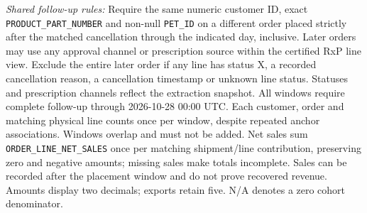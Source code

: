 \begin{table}[!htbp]
\begin{minipage}{\linewidth}
\textit{Shared follow-up rules:} Require the same numeric customer ID, exact
\texttt{PRODUCT\_PART\_NUMBER} and non-null \texttt{PET\_ID} on a different order
placed strictly after the matched cancellation through the indicated day, inclusive.
Later orders may use any approval channel or prescription source within the certified RxP line view.
Exclude the entire later order if any line has status X, a recorded cancellation reason,
a cancellation timestamp or unknown line status. Statuses and prescription channels reflect
the extraction snapshot. All windows require complete follow-up through 2026-10-28 00:00 UTC.
Each customer, order and matching physical line counts once per window, despite repeated
anchor associations. Windows overlap and must not be added. Net sales sum \texttt{ORDER\_LINE\_NET\_SALES} once per matching shipment/line contribution, preserving zero and negative amounts; missing sales make totals incomplete.
Sales can be recorded after the placement window and do not prove recovered revenue.
Amounts display two decimals; exports retain five. N/A denotes a zero cohort denominator.
\end{minipage}
\end{table}
